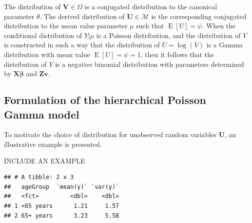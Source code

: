 \documentclass[a4paper,twoside,11pt]{report} %
\DeclareMathOperator{\E}{E}
\theoremstyle{definition}
\theoremstyle{definition}
\theoremstyle{definition}
\theoremstyle{definition}
\theoremstyle{remark}
\begin{document}
The distribution of \(\boldsymbol V\in\Omega\) is a conjugated distribution to the canonical parameter \(\theta\). The derived distribution of \(\boldsymbol U\in\mathcal{M}\) is the corresponding conjugated distribution to the mean value parameter \(\mu\) such that \(\E[U]=\psi\). When the conditional distribution of \(Y|\mu\) is a Poisson distribution, and the distribution of \(V\) is constructed in such a way that the distribution of \(U=\log(V)\) is a Gamma distribution with mean value \(\E[U]=\psi=1\), then it follows that the distribution of \(Y\) is a negative binomial distribution with parameters determined by \(\boldsymbol{X\beta}\) and \(\boldsymbol{Zv}\).

\subsection{Formulation of the hierarchical Poisson Gamma model}

To motivate the choice of distribution for unobserved random variables \(\boldsymbol U\), an illustrative example is presented.

INCLUDE AN EXAMPLE

\begin{verbatim}
## # A tibble: 2 x 3
##   ageGroup  `mean(y)` `var(y)`
##   <fct>         <dbl>    <dbl>
## 1 <65 years      1.21     1.57
## 2 65+ years      3.23     5.58
\end{verbatim}
\end{document}
